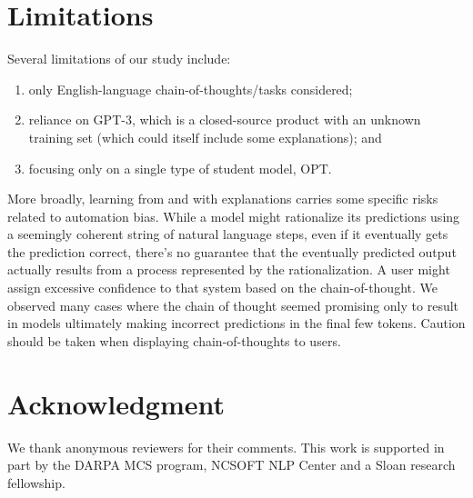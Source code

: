 \documentclass[11pt]{article}
\begin{document}
\section*{Limitations}

\label{sec:limitations}

Several limitations of our study include:
\begin{enumerate}[leftmargin=*,topsep=0pt,itemsep=-1ex,partopsep=1ex,parsep=1ex]
\item only English-language chain-of-thoughts/tasks considered;
\item reliance on GPT-3, which is a closed-source product with an unknown training set (which could itself include some explanations); and
\item focusing only on a single type of student model, OPT.
\end{enumerate}

More broadly, learning from and with explanations carries some specific risks related to automation bias. While a model might rationalize its predictions using a seemingly coherent string of natural language steps, even if it eventually gets the prediction correct, there's no guarantee that the eventually predicted output actually results from a process represented by the rationalization. A user might assign excessive confidence to that system based on the chain-of-thought. We observed many cases where the chain of thought seemed promising only to result in models ultimately making incorrect predictions in the final few tokens. Caution should be taken when displaying chain-of-thoughts to users.

\section*{Acknowledgment}
\label{sec:limitations}
We thank anonymous reviewers for their comments.
This work is supported in part by the DARPA MCS program, NCSOFT NLP Center and a Sloan research fellowship.



\end{document}
